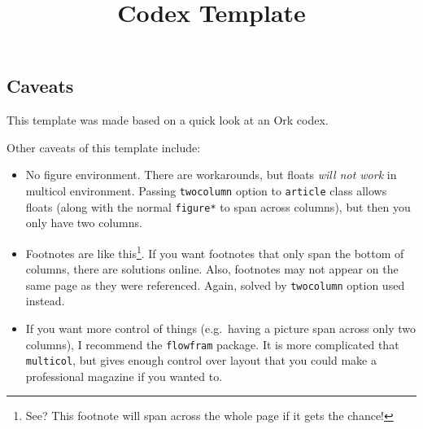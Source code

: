 \documentclass{article}
\begin{document}
\title{Codex Template}
\maketitle
\thispagestyle{fancy} %

\begin{multicols}{3}

\section{Caveats}\label{sec:caveats}%
This template was made based on a quick look at an Ork codex.

Other caveats of this template include:
\begin{itemize}
\item No figure environment. There are workarounds, but floats \emph{will not work} in multicol environment. Passing \verb=twocolumn= option to \verb=article= class allows floats (along with the normal \verb=figure*= to span across columns), but then you only have two columns.
\item Footnotes are like this\footnote{See? This footnote will span across the whole page if it gets the chance!}. If you want footnotes that only span the bottom of columns, there are solutions online. Also, footnotes may not appear on the same page as they were referenced. Again, solved by \verb=twocolumn= option used instead.
\item If you want more control of things (e.g.\ having a picture span across only two columns), I recommend the \verb=flowfram= package. It is more complicated that \verb=multicol=, but gives enough control over layout that you could make a professional magazine if you wanted to.
\end{itemize}


\end{multicols}
\end{document}
